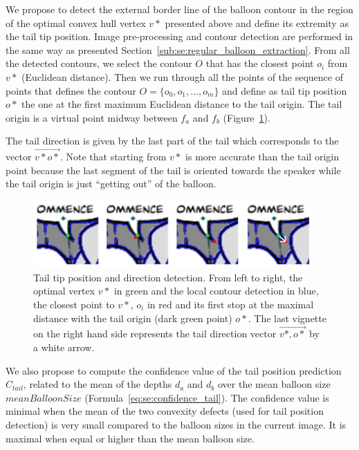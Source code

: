 We propose to detect the external border line of the balloon contour in the region of the optimal convex hull vertex $v*$ presented above and define its extremity as the tail tip position.
Image pre-processing and contour detection are performed in the same way as presented Section~\ref{sub:se:regular_balloon_extraction}.
From all the detected contours, we select the contour $O$ that has the closest point $o_i$ from $v*$ (Euclidean distance).
Then we run through all the points of the sequence of points that defines the contour $O=\{o_0, o_1,...,o_m\}$ and define as tail tip position $o*$ the one at the first maximum Euclidean distance to the tail origin.
The tail origin is a virtual point midway between $f_a$ and $f_b$ (Figure~\ref{fig:se:tail_tip_refinement}).


The tail direction is given by the last part of the tail which corresponds to the vector $\overrightarrow{v*o*}$.
Note that starting from $v*$ is more accurate than the tail origin point because the last segment of the tail is oriented towards the speaker while the tail origin is just ``getting out'' of the balloon.


    \begin{figure}[ht]%
      \centering
      \includegraphics[width=0.95\textwidth]{tail_refinement.png}
    \caption[Tail tip position and direction detection]{Tail tip position and direction detection. From left to right, the optimal vertex $v*$ in green and the local contour detection in blue, the closest point to $v*$, $o_i$ in red and its first stop at the maximal distance with the tail origin (dark green point) $o*$. The last vignette on the right hand side represents the tail direction vector $\overrightarrow{v*,o*}$ by a white arrow.}
    \label{fig:se:tail_tip_refinement}
    \end{figure}

We also propose to compute the confidence value of the tail position prediction $C_{tail}$, related to the mean of the depths $d_a$ and $d_b$ over the mean balloon size $meanBalloonSize$ (Formula~\ref{eq:se:confidence_tail}).
The confidence value is minimal when the mean of the two convexity defects (used for tail position detection) is very small compared to the balloon sizes in the current image.
It is maximal when equal or higher than the mean balloon size.

